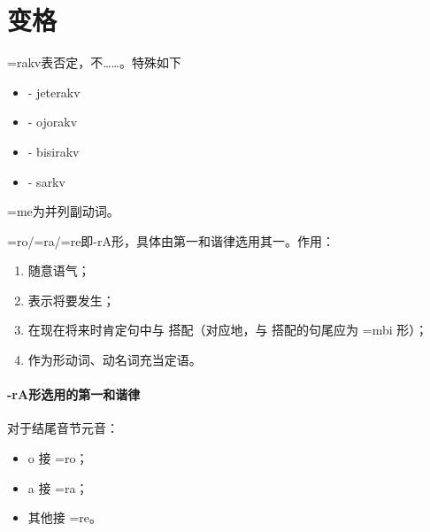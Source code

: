 \section{变格}

\V=rakv表否定，不……。特殊如下
    \begin{itemize}
        \item {} - jeterakv
        \item {} - ojorakv
        \item {} - bisirakv
        \item {} - sarkv
    \end{itemize}

\V=me为并列副动词。

\V=ro/\V=ra/\V=re即{\latin -rA}形，具体由第一和谐律选用其一。作用：
\begin{enumerate}
    \item 随意语气；
    \item 表示将要发生；
    \item 在现在将来时肯定句中与  搭配（对应地，与  搭配的句尾应为 =mbi 形）；
    \item 作为形动词、动名词充当定语。
\end{enumerate}

\paragraph{{\latin -rA}形选用的第一和谐律}对于\V 结尾音节元音：
\begin{itemize}
    \item o 接 =ro；
    \item a 接 =ra；
    \item 其他接 =re。
\end{itemize}
        
